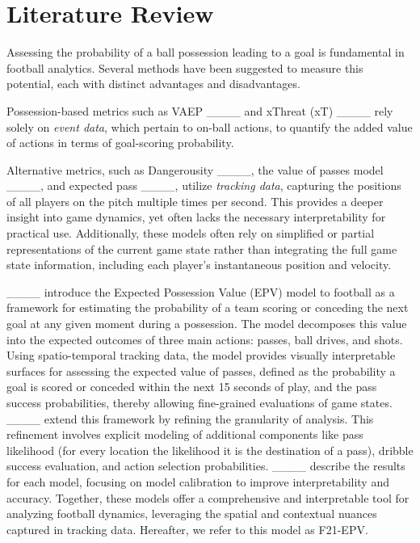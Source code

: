 \section{Literature Review}
\label{literature_review}

Assessing the probability of a ball possession leading to a goal is fundamental in football analytics. Several methods have been suggested to measure this potential, each with distinct advantages and disadvantages.

Possession-based metrics such as VAEP ____ and xThreat (xT) ____ rely solely on \textit{event data}, which pertain to on-ball actions, to quantify the added value of actions in terms of goal-scoring probability.

Alternative metrics, such as Dangerousity ____, the value of passes model ____, and expected pass ____, utilize \textit{tracking data}, capturing the positions of all players on the pitch multiple times per second. This provides a deeper insight into game dynamics, yet often lacks the necessary interpretability for practical use. Additionally, these models often rely on simplified or partial representations of the current game state rather than integrating the full game state information, including each player's instantaneous position and velocity.

____ introduce the Expected Possession Value (EPV) model to football as a framework for estimating the probability of a team scoring or conceding the next goal at any given moment during a possession. The model decomposes this value into the expected outcomes of three main actions: passes, ball drives, and shots. Using spatio-temporal tracking data, the model provides visually interpretable surfaces for assessing the expected value of passes, defined as the probability a goal is scored or conceded within the next 15 seconds of play, and the pass success probabilities, thereby allowing fine-grained evaluations of game states. ____ extend this framework by refining the granularity of analysis. This refinement involves explicit modeling of additional components like pass likelihood (for every location the likelihood it is the destination of a pass), dribble success evaluation, and action selection probabilities. ____ describe the results for each model, focusing on model calibration to improve interpretability and accuracy. Together, these models offer a comprehensive and interpretable tool for analyzing football dynamics, leveraging the spatial and contextual nuances captured in tracking data. Hereafter, we refer to this model as F21-EPV.

